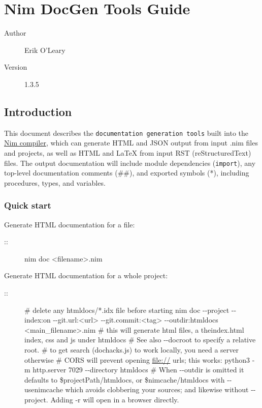 \hypertarget{nim-docgen-tools-guide}{%
\section{Nim DocGen Tools Guide}\label{nim-docgen-tools-guide}}

\begin{description}
\item[Author]
Erik O'Leary
\item[Version]
1.3.5
\end{description}

\hypertarget{introduction}{%
\subsection{Introduction}\label{introduction}}

This document describes the \texttt{documentation\ generation\ tools}
built into the \href{nimc.html}{Nim compiler}, which can generate HTML
and JSON output from input .nim files and projects, as well as HTML and
LaTeX from input RST (reStructuredText) files. The output documentation
will include module dependencies (\texttt{import}), any top-level
documentation comments (\#\#), and exported symbols (*), including
procedures, types, and variables.

\hypertarget{quick-start}{%
\subsubsection{Quick start}\label{quick-start}}

Generate HTML documentation for a file:

\begin{description}
\item[::]
nim doc \textless filename\textgreater.nim
\end{description}

Generate HTML documentation for a whole project:

\begin{description}
\item[::]
\# delete any htmldocs/*.idx file before starting nim doc -\/-project
-\/-index:on -\/-git.url:\textless url\textgreater{}
-\/-git.commit:\textless tag\textgreater{} -\/-outdir:htmldocs
\textless main\_filename\textgreater.nim \# this will generate html
files, a theindex.html index, css and js under {htmldocs} \# See also
{-\/-docroot} to specify a relative root. \# to get search (dochacks.js)
to work locally, you need a server otherwise \# CORS will prevent
opening \url{file://} urls; this works: python3 -m http.server 7029
-\/-directory htmldocs \# When -\/-outdir is omitted it defaults to
\$projectPath/htmldocs, or {\$nimcache/htmldocs} with {-\/-usenimcache}
which avoids clobbering your sources; and likewise without
{-\/-project}. Adding {-r} will open in a browser directly.
\end{description}

